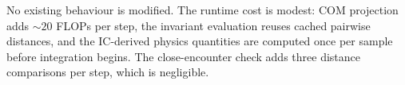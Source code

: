 \documentclass[11pt]{article}
\begin{document}
No existing behaviour is modified. The runtime cost is modest: COM projection
adds $\sim 20$ FLOPs per step, the invariant evaluation reuses cached pairwise
distances, and the IC-derived physics quantities are computed once per sample
before integration begins. The close-encounter check adds three distance
comparisons per step, which is negligible.
\end{document}
